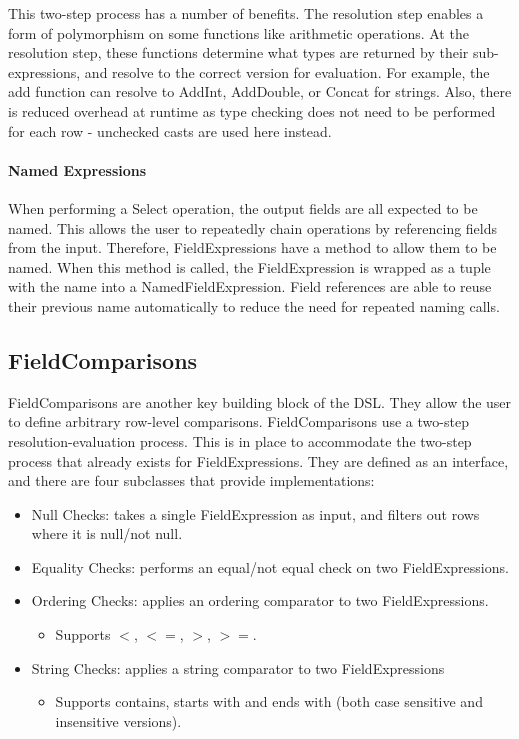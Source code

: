 This two-step process has a number of benefits. The resolution step enables a form of polymorphism on some functions like arithmetic operations. At the resolution step, these functions determine what types are returned by their sub-expressions, and resolve to the correct version for evaluation. For example, the add function can resolve to AddInt, AddDouble, or Concat for strings. Also, there is reduced overhead at runtime as type checking does not need to be performed for each row - unchecked casts are used here instead.

\paragraph{Named Expressions}
When performing a Select operation, the output fields are all expected to be named. This allows the user to repeatedly chain operations by referencing fields from the input. Therefore, FieldExpressions have a method to allow them to be named. When this method is called, the FieldExpression is wrapped as a tuple with the name into a NamedFieldExpression. Field references are able to reuse their previous name automatically to reduce the need for repeated naming calls. 


\subsection{FieldComparisons}
FieldComparisons are another key building block of the DSL. They allow the user to define arbitrary row-level comparisons. FieldComparisons use a two-step resolution-evaluation process. This is in place to accommodate the two-step process that already exists for FieldExpressions. They are defined as an interface, and there are four subclasses that provide implementations:

\begin{itemize}
	\item Null Checks: takes a single FieldExpression as input, and filters out rows where it is null/not null.
	\item Equality Checks: performs an equal/not equal check on two FieldExpressions.
	\item Ordering Checks: applies an ordering comparator to two FieldExpressions.
	\begin{itemize}
		\item Supports $<$, $<=$, $>$, $>=$.
	\end{itemize}
	\item String Checks: applies a string comparator to two FieldExpressions
	\begin{itemize}
		\item Supports contains, starts with and ends with (both case sensitive and insensitive versions).
	\end{itemize}
\end{itemize}

